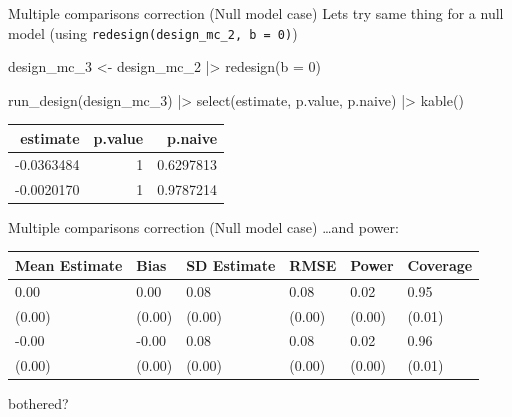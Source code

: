 \documentclass[
  11pt,
  ignorenonframetext,
]{beamer}
\newenvironment{Shaded}{\begin{snugshade}}{\end{snugshade}}
\newcommand{\AttributeTok}[1]{\textcolor[rgb]{0.40,0.45,0.13}{#1}}
\newcommand{\DecValTok}[1]{\textcolor[rgb]{0.68,0.00,0.00}{#1}}
\newcommand{\FunctionTok}[1]{\textcolor[rgb]{0.28,0.35,0.67}{#1}}
\newcommand{\NormalTok}[1]{\textcolor[rgb]{0.00,0.23,0.31}{#1}}
\newcommand{\OtherTok}[1]{\textcolor[rgb]{0.00,0.23,0.31}{#1}}
\newcommand{\SpecialCharTok}[1]{\textcolor[rgb]{0.37,0.37,0.37}{#1}}
\begin{document}
\begin{frame}[fragile]{Multiple comparisons correction (Null model
case)}
\protect\hypertarget{multiple-comparisons-correction-null-model-case}{}
Lets try same thing for a null model (using
\texttt{redesign(design\_mc\_2,\ b\ =\ 0)})

\begin{Shaded}
\begin{Highlighting}[]
\NormalTok{design\_mc\_3 }\OtherTok{\textless{}{-}} 
\NormalTok{  design\_mc\_2 }\SpecialCharTok{|\textgreater{}} 
  \FunctionTok{redesign}\NormalTok{(}\AttributeTok{b =} \DecValTok{0}\NormalTok{) }

\FunctionTok{run\_design}\NormalTok{(design\_mc\_3) }\SpecialCharTok{|\textgreater{}} \FunctionTok{select}\NormalTok{(estimate, p.value, p.naive) }\SpecialCharTok{|\textgreater{}} \FunctionTok{kable}\NormalTok{()}
\end{Highlighting}
\end{Shaded}

\begin{tabular}{r|r|r}
\hline
estimate & p.value & p.naive\\
\hline
-0.0363484 & 1 & 0.6297813\\
\hline
-0.0020170 & 1 & 0.9787214\\
\hline
\end{tabular}
\end{frame}

\begin{frame}{Multiple comparisons correction (Null model case)}
\protect\hypertarget{multiple-comparisons-correction-null-model-case-1}{}
\ldots and power:

\begin{tabular}{l|l|l|l|l|l}
\hline
Mean Estimate & Bias & SD Estimate & RMSE & Power & Coverage\\
\hline
0.00 & 0.00 & 0.08 & 0.08 & 0.02 & 0.95\\
\hline
(0.00) & (0.00) & (0.00) & (0.00) & (0.00) & (0.01)\\
\hline
-0.00 & -0.00 & 0.08 & 0.08 & 0.02 & 0.96\\
\hline
(0.00) & (0.00) & (0.00) & (0.00) & (0.00) & (0.01)\\
\hline
\end{tabular}

bothered?
\end{frame}
\end{document}
